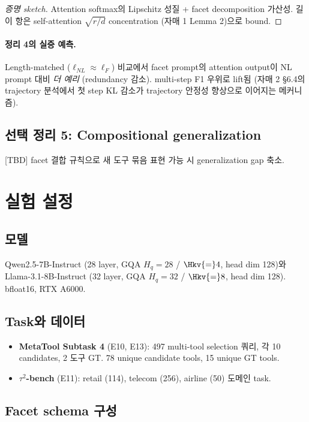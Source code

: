 \documentclass[11pt]{article}
\theoremstyle{plain}
\theoremstyle{definition}
\theoremstyle{remark}
\newcommand{\Hq}{H_{\!q}}
\begin{document}
\begin{proof}[증명 sketch]
Attention softmax의 Lipschitz 성질 + facet decomposition 가산성. 길이 항은 self-attention $\sqrt{r/d}$ concentration (자매 1 Lemma 2)으로 bound.
\end{proof}

\paragraph{정리 4의 실증 예측.}
Length-matched ($\ell_{NL} \approx \ell_F$) 비교에서 facet prompt의 attention output이 NL prompt 대비 \emph{더 예리} (redundancy 감소). multi-step F1 우위로 lift됨 (자매 2 §6.4의 trajectory 분석에서 첫 step KL 감소가 trajectory 안정성 향상으로 이어지는 메커니즘).

\subsection{선택 정리 5: Compositional generalization}
\label{sec:thm5}

[TBD] facet 결합 규칙으로 새 도구 묶음 표현 가능 시 generalization gap 축소.

\section{실험 설정}
\label{sec:experiments}

\subsection{모델}
Qwen2.5-7B-Instruct (28 layer, GQA $\Hq{=}28$ / $\Hkv{=}4$, head dim 128)와 Llama-3.1-8B-Instruct (32 layer, GQA $\Hq{=}32$ / $\Hkv{=}8$, head dim 128). bfloat16, RTX A6000.

\subsection{Task와 데이터}
\begin{itemize}[leftmargin=*]
\item \textbf{MetaTool Subtask 4} (E10, E13): 497 multi-tool selection 쿼리, 각 10 candidates, 2 도구 GT. 78 unique candidate tools, 15 unique GT tools.
\item \textbf{$\tau^2$-bench} (E11): retail (114), telecom (256), airline (50) 도메인 task.
\end{itemize}

\subsection{Facet schema 구성}
\label{sec:facet-schema}
\end{document}
